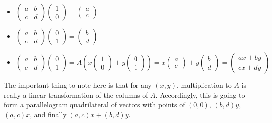 \documentclass[12pt]{amsart}
\begin{document}
\begin{itemize}
	\item $\begin{pmatrix}a&b\\c&d\end{pmatrix}\begin{pmatrix}1\\0\end{pmatrix}=\begin{pmatrix}a\\c\end{pmatrix}$
	\item $\begin{pmatrix}a&b\\c&d\end{pmatrix}\begin{pmatrix}0\\1\end{pmatrix}=\begin{pmatrix}b\\d\end{pmatrix}$
	\item $\begin{pmatrix}a&b\\c&d\end{pmatrix}\begin{pmatrix}0\\1\end{pmatrix}= A(x\begin{pmatrix}1\\0\end{pmatrix} + y\begin{pmatrix}0\\1\end{pmatrix}) = x\begin{pmatrix}a\\c\end{pmatrix} + y\begin{pmatrix}b\\d\end{pmatrix}=\begin{pmatrix}ax+by\\cx+dy\end{pmatrix}$
\end{itemize}
The important thing to note here is that for any $(x, y)$, multiplication to $A$ is really a linear transformation of the columns of $A$. Accordingly, this is going to form a parallelogram quadrilateral of vectors with points of $(0,0)$, $(b,d)y$, $(a,c)x$, and finally $(a,c)x + (b,d)y$.\\
\end{document}
